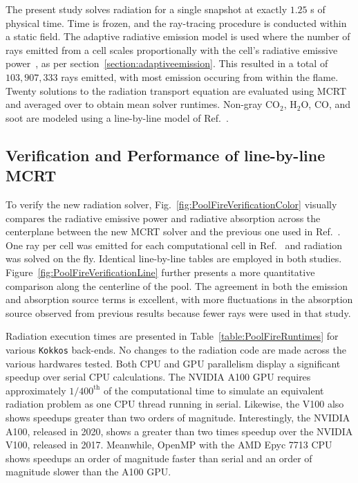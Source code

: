 The present study solves radiation for a single snapshot at exactly $1.25$ s of physical time. Time is frozen, and the ray-tracing procedure is conducted within a static field. The adaptive radiative emission model is used where the number of rays emitted from a cell scales proportionally with the cell's radiative emissive power~\cite{Wang2007AnFields}, as per section~\ref{section:adaptiveemission}. This resulted in a total of $103,907,333$ rays emitted, with most emission occuring from within the flame. Twenty solutions to the radiation transport equation are evaluated using MCRT and averaged over to obtain mean solver runtimes.
Non-gray CO$_2$, H$_2$O, CO, and soot are modeled using a line-by-line model of Ref.~\cite{Ren2019Line-by-lineSystem}. 

\subsection{Verification and Performance of line-by-line MCRT}
To verify the new radiation solver,
Fig.~\ref{fig:PoolFireVerificationColor} visually compares the radiative emissive power and radiative absorption across the centerplane between the new MCRT solver and the previous one used in Ref.~\cite{Wu2020DetailedFire}. One ray per cell was emitted for each computational cell in Ref.~\cite{Wu2020DetailedFire} and radiation was solved on the fly. Identical line-by-line tables are employed in both studies. 
Figure~\ref{fig:PoolFireVerificationLine} further presents a more quantitative comparison along the centerline of the pool. The agreement in both the emission and absorption source terms is excellent, with more fluctuations in the absorption source observed from previous results because fewer rays were used in that study. 

Radiation execution times are presented in Table~\ref{table:PoolFireRuntimes} for various \texttt{Kokkos} back-ends. No changes to the radiation code are made across the various hardwares tested. Both CPU and GPU parallelism display a significant speedup over serial CPU calculations.
The NVIDIA A100 GPU requires approximately $1/400^{\text{th}}$ of the computational time to simulate an equivalent radiation problem as one CPU thread running in serial. Likewise, the V100 also shows speedups greater than two orders of magnitude. Interestingly, the NVIDIA A100, released in 2020, shows a greater than two times speedup over the NVIDIA V100, released in 2017. Meanwhile, OpenMP with the AMD Epyc 7713 CPU shows speedups an order of magnitude faster than serial and an order of magnitude slower than the A100 GPU.

